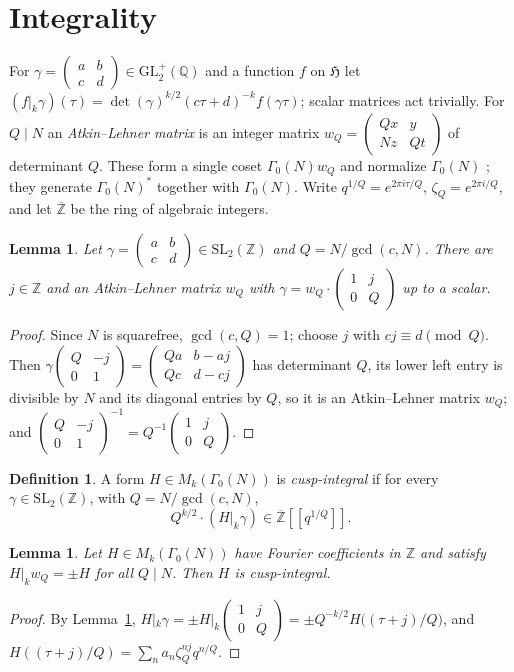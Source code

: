 \documentclass[11pt]{amsart}
\newtheorem{lemma}[theorem]{Lemma}
\theoremstyle{definition}
\newtheorem{definition}[theorem]{Definition}
\theoremstyle{remark}
\newcommand{\Z}{\mathbb{Z}}
\newcommand{\Q}{\mathbb{Q}}
\newcommand{\HH}{\mathfrak{H}}
\newcommand{\Zbar}{\overline{\Z}}
\newcommand{\SL}{\mathrm{SL}}
\newcommand{\GL}{\mathrm{GL}}
\newcommand{\Gs}{\Gamma_0(N)^*}
\newcommand{\smat}[4]{\left(\begin{smallmatrix}#1&#2\\#3&#4\end{smallmatrix}\right)}
\begin{document}
\section{Integrality}\label{sec:int}

For $\gamma=\smat abcd\in\GL_2^+(\Q)$ and a function $f$ on $\HH$ let
$(f|_k\gamma)(\tau)=\det(\gamma)^{k/2}(c\tau+d)^{-k}f(\gamma\tau)$; scalar
matrices act trivially.  For $Q\mid N$ an \emph{Atkin--Lehner matrix} is an
integer matrix $w_Q=\smat{Qx}{y}{Nz}{Qt}$ of determinant $Q$.  These form a single
coset $\Gamma_0(N)w_Q$ and normalize $\Gamma_0(N)$ \cite[\S2]{AL}; they
generate $\Gs$ together with $\Gamma_0(N)$.  Write $q^{1/Q}=e^{2\pi i\tau/Q}$,
$\zeta_Q=e^{2\pi i/Q}$, and let $\Zbar$ be the ring of algebraic integers.

\begin{lemma}\label{lem:coset}
Let $\gamma=\smat abcd\in\SL_2(\Z)$ and $Q=N/\gcd(c,N)$.  There are $j\in\Z$ and
an Atkin--Lehner matrix $w_Q$ with
$\gamma=w_Q\cdot\smat 1j0Q$ up to a scalar.
\end{lemma}
\begin{proof}
Since $N$ is squarefree, $\gcd(c,Q)=1$; choose $j$ with $cj\equiv d\pmod Q$.
Then $\gamma\smat Q{-j}01=\smat{Qa}{b-aj}{Qc}{d-cj}$ has determinant $Q$, its
lower left entry is divisible by $N$ and its diagonal entries by $Q$, so it is
an Atkin--Lehner matrix $w_Q$; and $\smat Q{-j}01^{-1}=Q^{-1}\smat 1j0Q$.
\end{proof}

\begin{definition}
A form $H\in M_k(\Gamma_0(N))$ is \emph{cusp-integral} if for every
$\gamma\in\SL_2(\Z)$, with $Q=N/\gcd(c,N)$,
\[
Q^{k/2}\cdot(H|_k\gamma)\in\Zbar[[q^{1/Q}]] .
\]
\end{definition}

\begin{lemma}\label{lem:AL-ci}
Let $H\in M_k(\Gamma_0(N))$ have Fourier coefficients in $\Z$ and satisfy
$H|_kw_Q=\pm H$ for all $Q\mid N$.  Then $H$ is cusp-integral.
\end{lemma}
\begin{proof}
By Lemma~\ref{lem:coset},
$H|_k\gamma=\pm H|_k\smat 1j0Q=\pm Q^{-k/2}H\bigl((\tau+j)/Q\bigr)$, and
$H((\tau+j)/Q)=\sum_n a_n\zeta_Q^{nj}q^{n/Q}$.
\end{proof}
\end{document}
